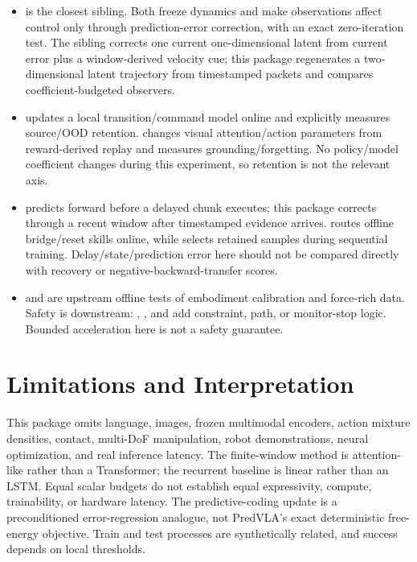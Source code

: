 \documentclass[11pt]{article}
\begin{document}
\begin{itemize}[leftmargin=1.5em]
  \item {} is the closest sibling. Both freeze dynamics and make observations affect control only through prediction-error correction, with an exact zero-iteration test. The sibling corrects one current one-dimensional latent from current error plus a window-derived velocity cue; this package regenerates a two-dimensional latent trajectory from timestamped packets and compares coefficient-budgeted observers.
  \item {} updates a local transition/command model online and explicitly measures source/OOD retention.  changes visual attention/action parameters from reward-derived replay and measures grounding/forgetting. No policy/model coefficient changes during this experiment, so retention is not the relevant axis.
  \item {} predicts forward before a delayed chunk executes; this package corrects through a recent window after timestamped evidence arrives.  routes offline bridge/reset skills online, while  selects retained samples during sequential training. Delay/state/prediction error here should not be compared directly with recovery or negative-backward-transfer scores.
  \item {} and  are upstream offline tests of embodiment calibration and force-rich data. Safety is downstream: , , and  add constraint, path, or monitor-stop logic. Bounded acceleration here is not a safety guarantee.
\end{itemize}

\section{Limitations and Interpretation}

This package omits language, images, frozen multimodal encoders, action mixture densities, contact, multi-DoF manipulation, robot demonstrations, neural optimization, and real inference latency. The finite-window method is attention-like rather than a Transformer; the recurrent baseline is linear rather than an LSTM. Equal scalar budgets do not establish equal expressivity, compute, trainability, or hardware latency. The predictive-coding update is a preconditioned error-regression analogue, not PredVLA's exact deterministic free-energy objective. Train and test processes are synthetically related, and success depends on local thresholds.
\end{document}
